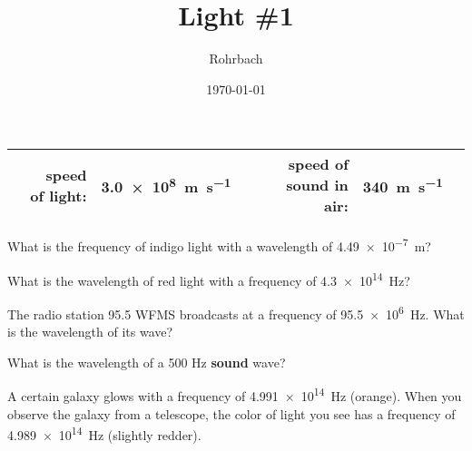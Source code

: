 \documentclass[10pt]{exam}
\title{Light \#1}
\author{Rohrbach}
\date{\today}
\begin{document}
\maketitle

\begin{center}
  \renewcommand{\arraystretch}{2}
  \begin{tabular}{|crlc|crlc|}
    \hline
     & speed of light: & \SI{3.0e8}{\meter\per\second} & &
     & speed of sound in air: & \SI{340}{\meter\per\second} &
    \\\hline
  \end{tabular}
\end{center}

\begin{questions}

\question
  What is the frequency of indigo light with a wavelength of \SI{4.49e-7}{\meter}?
  \vs

\question
  What is the wavelength of red light with a frequency of \SI{4.3e14}{\hertz}?
  \vs

\question
  The radio station 95.5 WFMS broadcasts at a frequency of \SI{95.5e6}{\hertz}.  What is the wavelength of its wave?
  \vs

\question
  What is the wavelength of a 500 Hz {\bf sound} wave?
  \vs
  
\question
  A certain galaxy glows with a frequency of \SI{4.991e14}{\hertz} (orange).  When you observe the galaxy from a telescope, the color of light you see has a frequency of \SI{4.989e14}{\hertz} (slightly redder).

  
  
  
  
  
  
  
  
  
\end{questions}
\end{document}
